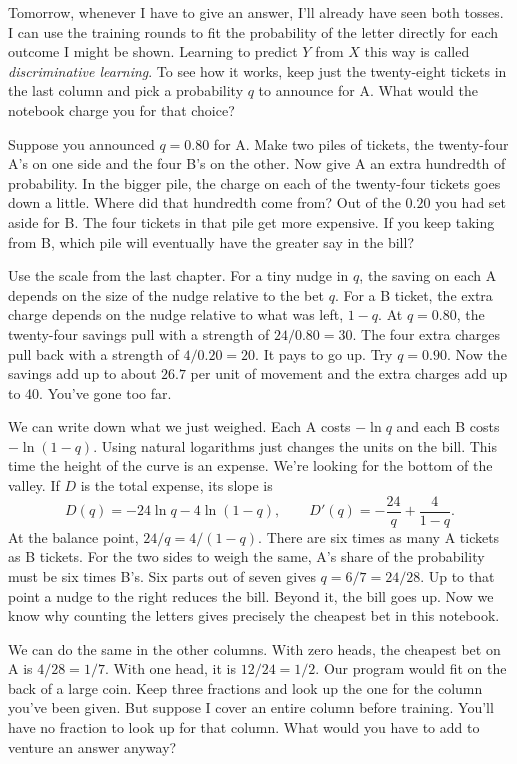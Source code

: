 Tomorrow, whenever I have to give an answer, I'll already have seen both tosses. I can use the training rounds to fit the probability of the letter directly for each outcome I might be shown. Learning to predict $Y$ from $X$ this way is called \emph{discriminative learning}. To see how it works, keep just the twenty-eight tickets in the last column and pick a probability $q$ to announce for A. What would the notebook charge you for that choice?

Suppose you announced $q=0.80$ for A. Make two piles of tickets, the twenty-four A's on one side and the four B's on the other. Now give A an extra hundredth of probability. In the bigger pile, the charge on each of the twenty-four tickets goes down a little. Where did that hundredth come from? Out of the $0.20$ you had set aside for B. The four tickets in that pile get more expensive. If you keep taking from B, which pile will eventually have the greater say in the bill?

Use the scale from the last chapter. For a tiny nudge in $q$, the saving on each A depends on the size of the nudge relative to the bet $q$. For a B ticket, the extra charge depends on the nudge relative to what was left, $1-q$. At $q=0.80$, the twenty-four savings pull with a strength of $24/0.80=30$. The four extra charges pull back with a strength of $4/0.20=20$. It pays to go up. Try $q=0.90$. Now the savings add up to about $26.7$ per unit of movement and the extra charges add up to 40. You've gone too far.

We can write down what we just weighed. Each A costs $-\ln q$ and each B costs $-\ln(1-q)$. Using natural logarithms just changes the units on the bill. This time the height of the curve is an expense. We're looking for the bottom of the valley. If $D$ is the total expense, its slope is
\[
 D(q)=-24\ln q-4\ln(1-q),\qquad
 D'(q)=-\frac{24}{q}+\frac{4}{1-q}.
\]
At the balance point, $24/q=4/(1-q)$. There are six times as many A tickets as B tickets. For the two sides to weigh the same, A's share of the probability must be six times B's. Six parts out of seven gives $q=6/7=24/28$. Up to that point a nudge to the right reduces the bill. Beyond it, the bill goes up. Now we know why counting the letters gives precisely the cheapest bet in this notebook.

We can do the same in the other columns. With zero heads, the cheapest bet on A is $4/28=1/7$. With one head, it is $12/24=1/2$. Our program would fit on the back of a large coin. Keep three fractions and look up the one for the column you've been given. But suppose I cover an entire column before training. You'll have no fraction to look up for that column. What would you have to add to venture an answer anyway?

